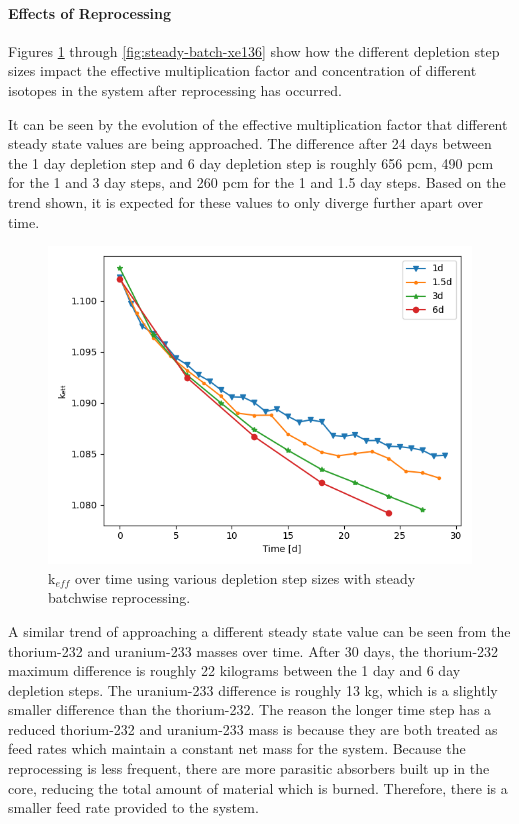 \paragraph{Effects of Reprocessing}

Figures \ref{fig:steady-batch-k} through \ref{fig:steady-batch-xe136} show how the different depletion step sizes impact the effective multiplication factor and concentration of different isotopes in the system after reprocessing has occurred.

It can be seen by the evolution of the effective multiplication factor that different steady state values are being approached. The difference after 24 days between the 1 day depletion step and 6 day depletion step is roughly 656 pcm, 490 pcm for the 1 and 3 day steps, and 260 pcm for the 1 and 1.5 day steps. Based on the trend shown, it is expected for these values to only diverge further apart over time.

\begin{figure}[H]
  \centering
  \includegraphics[scale=0.5]{images/keff-batch-dep-refine.png}
  \caption{k$_{eff}$ over time using various depletion step sizes with steady batchwise reprocessing.}
   \label{fig:steady-batch-k}
\end{figure}

A similar trend of approaching a different steady state value can be seen from the thorium-232 and uranium-233 masses over time. After 30 days, the thorium-232 maximum difference is roughly 22 kilograms between the 1 day and 6 day depletion steps. The uranium-233 difference is roughly 13 kg, which is a slightly smaller difference than the thorium-232. The reason the longer time step has a reduced thorium-232 and uranium-233 mass is because they are both treated as feed rates which maintain a constant net mass for the system. Because the reprocessing is less frequent, there are more parasitic absorbers built up in the core, reducing the total amount of material which is burned. Therefore, there is a smaller feed rate provided to the system.

